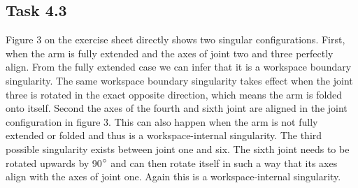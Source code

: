 \subsection*{Task 4.3}

Figure 3 on the exercise sheet directly shows two singular configurations. First, when the arm is fully extended and the axes of joint two and three perfectly align. From the fully extended case we can infer that it is a workspace boundary singularity. The same workspace boundary singularity takes effect when the joint three is rotated in the exact opposite direction, which means the arm is folded onto itself. Second the axes of the fourth and sixth joint are aligned in the joint configuration in figure 3. This can also happen when the arm is not fully extended or folded and thus is a workspace-internal singularity. The third possible singularity exists between joint one and six. The sixth joint needs to be rotated upwards by 90$\degree$ and can then rotate itself in such a way that its axes align with the axes of joint one. Again this is a workspace-internal singularity.